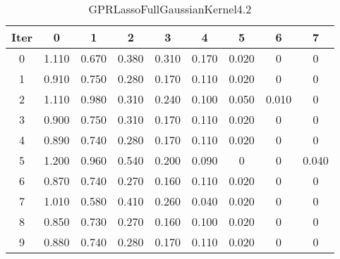 \begin{table}
	\begin{center}
		\begin{tabular}{|c|c|c|c|c|c|c|c|c|}
			\hline
			Iter & 0 & 1 & 2 & 3 & 4 & 5 & 6 & 7 \\
			\hline
			0 & 1.110 & 0.670 & 0.380 & 0.310 & 0.170 & 0.020 & 0 & 0 \\
			\hline
			1 & 0.910 & 0.750 & 0.280 & 0.170 & 0.110 & 0.020 & 0 & 0 \\
			\hline
			2 & 1.110 & 0.980 & 0.310 & 0.240 & 0.100 & 0.050 & 0.010 & 0 \\
			\hline
			3 & 0.900 & 0.750 & 0.310 & 0.170 & 0.110 & 0.020 & 0 & 0 \\
			\hline
			4 & 0.890 & 0.740 & 0.280 & 0.170 & 0.110 & 0.020 & 0 & 0 \\
			\hline
			5 & 1.200 & 0.960 & 0.540 & 0.200 & 0.090 & 0 & 0 & 0.040 \\
			\hline
			6 & 0.870 & 0.740 & 0.270 & 0.160 & 0.110 & 0.020 & 0 & 0 \\
			\hline
			7 & 1.010 & 0.580 & 0.410 & 0.260 & 0.040 & 0.020 & 0 & 0 \\
			\hline
			8 & 0.850 & 0.730 & 0.270 & 0.160 & 0.100 & 0.020 & 0 & 0 \\
			\hline
			9 & 0.880 & 0.740 & 0.280 & 0.170 & 0.110 & 0.020 & 0 & 0 \\
			\hline
		\end{tabular}
	\end{center}
	\caption{GPRLassoFullGaussianKernel4.2}
\end{table}